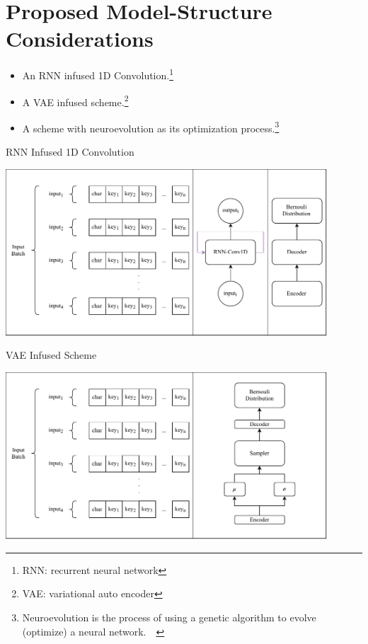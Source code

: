 \documentclass[a4paper, 12pt]{report}
\begin{document}
\section*{\textbf{Proposed Model-Structure Considerations}}
\begin{itemize}
	\item An RNN infused 1D Convolution.\footnote{RNN: recurrent neural network\citep{Hochreiter1997}}
	\item A VAE infused scheme.\footnote{VAE: variational auto encoder\citep{2013arXiv1312.6114K}}
	\item A scheme with neuroevolution as its optimization process.\footnote{Neuroevolution is the process of using a genetic algorithm to evolve (optimize) a neural network.~\citep{Floreano2008}~\citep{DBLP:journals/corr/abs-1803-00657}\citep{GeneticLander}}
\end{itemize}
\newpage
\begin{blockfigure}{RNN Infused 1D Convolution}
	\begin{center}
		\includegraphics[width = 0.9\textwidth]{suggestion_rnn_conv1d}
	\end{center}
\end{blockfigure}
\begin{blockfigure}{VAE Infused Scheme}
	\begin{center}
		\includegraphics[width = 0.9\textwidth]{suggestion_vae}
	\end{center}
\end{blockfigure}
\end{document}
